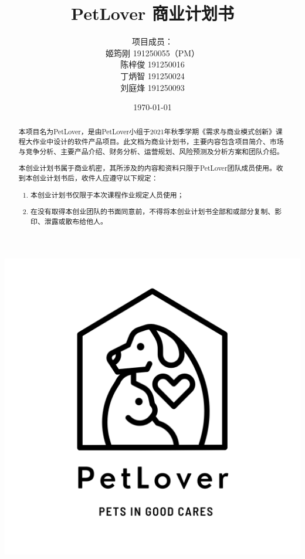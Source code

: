 \documentclass[a4paper]{ctexart}
\title{\Huge PetLover 商业计划书}
\author{
  项目成员：\\
  姬筠刚 191250055（PM）\\
  陈梓俊 191250016\\
  丁炳智 191250024\\
  刘庭烽 191250093\\
}
\date{\today}
\begin{document}
\maketitle

\centerline{\includegraphics[]{logo.png}}

\newpage

\tableofcontents

\newpage

\setlength{\parskip}{1em}

\begin{abstract}
  本项目名为PetLover，是由PetLover小组于2021年秋季学期《需求与商业模式创新》课程大作业中设计的软件产品项目。此文档为商业计划书，主要内容包含项目简介、市场与竞争分析、主要产品介绍、财务分析、运营规划、风险预测及分析方案和团队介绍。
  
  本创业计划书属于商业机密，其所涉及的内容和资料只限于PetLover团队成员使用。收到本创业计划书后，收件人应遵守以下规定：
\begin{enumerate}
  \item 本创业计划书仅限于本次课程作业规定人员使用；
  \item 在没有取得本创业团队的书面同意前，不得将本创业计划书全部和或部分复制、影印、泄露或散布给他人。
\end{enumerate}
\end{abstract}
\end{document}
